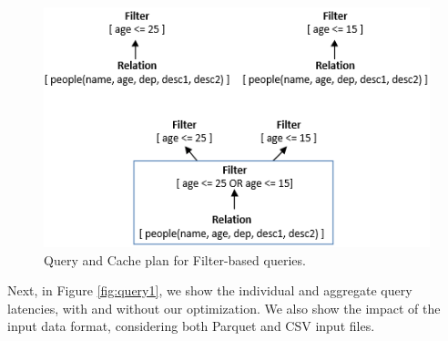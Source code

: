 \begin{figure}[htbp]
   \centering
   \includegraphics[scale=0.5]{figures/query1_cacheplan}
   \caption{Query and Cache plan for Filter-based queries.} 
   \label{fig:query1_plans}
\end{figure}

Next, in Figure \ref{fig:query1}, we show the individual and aggregate query latencies, with and without our optimization. We also show the impact of the input data format, considering both Parquet and CSV input files.

